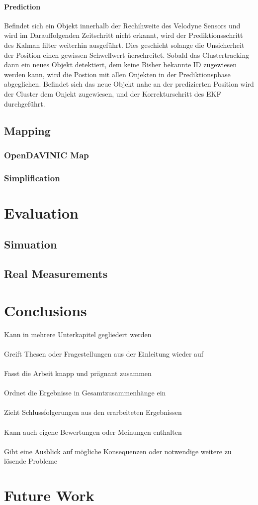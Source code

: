 \documentclass[11pt,oneside,openright]{mpreport}
\begin{document}
\subsubsection{Prediction}
Befindet sich ein Objekt innerhalb der Rechihweite des Velodyne Sensors und wird im Darauffolgenden Zeitschritt nicht erkannt,
wird der Prediktionsschritt des Kalman filter weiterhin ausgeführt. Dies geschieht solange die Unsicherheit der Position einen gewissen Schwellwert üerschreitet.
Sobald das Clustertracking dann ein neues Objekt detektiert, dem keine Bisher bekannte ID zugewiesen werden kann, wird die Postion mit allen Onjekten in der Prediktionsphase
abgeglichen. Befindet sich das neue Objekt nahe an der predizierten Position wird der Cluster dem Onjekt zugewiesen, und der Korrekturschritt des EKF durchgeführt.







\section{Mapping}
\subsection{OpenDAVINIC Map}
\subsection{Simplification}




\chapter{Evaluation}

\section{Simuation}
\section{Real Measurements}
\chapter{Conclusions}
Kann in mehrere Unterkapitel gegliedert werden\\\\
Greift Thesen oder Fragestellungen aus der Einleitung wieder auf\\\\
Fasst die Arbeit knapp und prägnant zusammen\\\\
Ordnet die Ergebnisse in Gesamtzusammenhänge ein\\\\
Zieht Schlussfolgerungen aus den erarbeiteten Ergebnissen\\\\
Kann auch eigene Bewertungen oder Meinungen enthalten\\\\
Gibt eine Ausblick auf mögliche Konsequenzen oder notwendige weitere zu lösende Probleme
\chapter{Future Work}

\printbibliography
\end{document}
